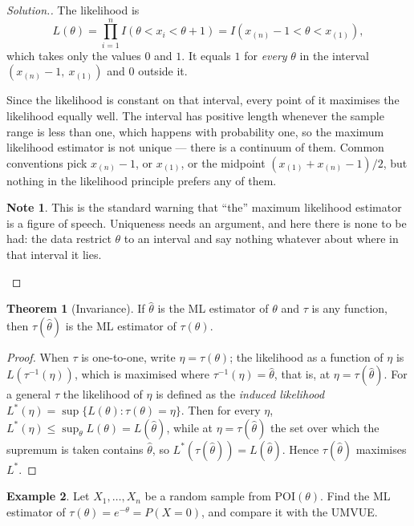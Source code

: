 \documentclass[12pt,a4paper]{report}
\theoremstyle{definition}
\newtheorem{thm}{Theorem}[section]
\newtheorem{exa}[thm]{Example}
\newtheorem*{note}{Note}
\newenvironment{solution}
  {\renewcommand{\qedsymbol}{}\begin{proof}[\textit{Solution}.]}
  {\end{proof}}
\begin{document}
\begin{solution}
The likelihood is
\[L(\theta) = \prod_{i=1}^{n} I\left(\theta<x_i<\theta+1\right)
= I\left(x_{(n)}-1 < \theta < x_{(1)}\right),\]
which takes only the values $0$ and $1$. It equals $1$ for \emph{every} $\theta$
in the interval $\left(x_{(n)}-1,\ x_{(1)}\right)$ and $0$ outside it.

Since the likelihood is constant on that interval, every point of it maximises
the likelihood equally well. The interval has positive length whenever the
sample range is less than one, which happens with probability one, so the
maximum likelihood estimator is not unique --- there is a continuum of them.
Common conventions pick $x_{(n)}-1$, or $x_{(1)}$, or the midpoint
$\left(x_{(1)}+x_{(n)}-1\right)/2$, but nothing in the likelihood principle
prefers any of them.

\begin{note}
This is the standard warning that ``the'' maximum likelihood estimator is a
figure of speech. Uniqueness needs an argument, and here there is none to be
had: the data restrict $\theta$ to an interval and say nothing whatever about
where in that interval it lies.
\end{note}
\end{solution}

\begin{thm}[Invariance]
\label{thm:invariance}
If $\hat\theta$ is the ML estimator of $\theta$ and $\tau$ is any function, then
$\tau(\hat\theta)$ is the ML estimator of $\tau(\theta)$.
\end{thm}

\begin{proof}
When $\tau$ is one-to-one, write $\eta = \tau(\theta)$; the likelihood as a function of
$\eta$ is $L(\tau^{-1}(\eta))$, which is maximised where $\tau^{-1}(\eta) = \hat\theta$,
that is, at $\eta = \tau(\hat\theta)$. For a general $\tau$ the likelihood of $\eta$ is
defined as the \emph{induced likelihood}
$L^*(\eta) = \sup\{L(\theta) : \tau(\theta) = \eta\}$. Then for every $\eta$,
$L^*(\eta)\le\sup_\theta L(\theta) = L(\hat\theta)$, while at $\eta = \tau(\hat\theta)$ the
set over which the supremum is taken contains $\hat\theta$, so
$L^*(\tau(\hat\theta)) = L(\hat\theta)$. Hence $\tau(\hat\theta)$ maximises $L^*$.
\end{proof}

\begin{exa}
\label{ex:poissoninvariance}
Let $X_1, \dots, X_n$ be a random sample from $\text{POI}(\theta)$. Find the ML
estimator of $\tau(\theta) = e^{-\theta} = P(X = 0)$, and compare it with the UMVUE.
\end{exa}
\end{document}
